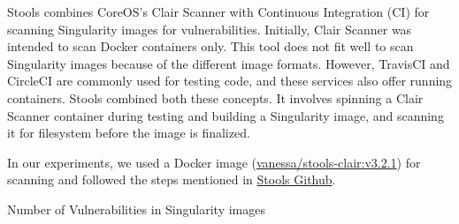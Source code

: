 \documentclass[a4paper,num-refs]{oup-contemporary}
\begin{document}
Stools combines CoreOS's Clair Scanner with Continuous Integration (CI)
for scanning Singularity images for vulnerabilities.
Initially, Clair Scanner was intended to scan Docker containers only. This tool does not fit well
to scan Singularity images because of the different image formats.
However, TravisCI and CircleCI are commonly used for testing code, and these
services also offer running containers. Stools combined both these concepts.
It involves spinning a Clair Scanner container during testing and building a
Singularity image, and scanning it for filesystem before the image is finalized.

In our experiments, we used a Docker image (\href{https://hub.docker.com/r/vanessa/stools-clair}{vanessa/stools-clair:v3.2.1})
for scanning and followed the steps mentioned in \href{https://github.com/singularityhub/stools}{Stools Github}.

\begin{table}
%
       \centering
        \caption{\label{sing}Number of Vulnerabilities in Singularity images}
\end{table}
\end{document}
